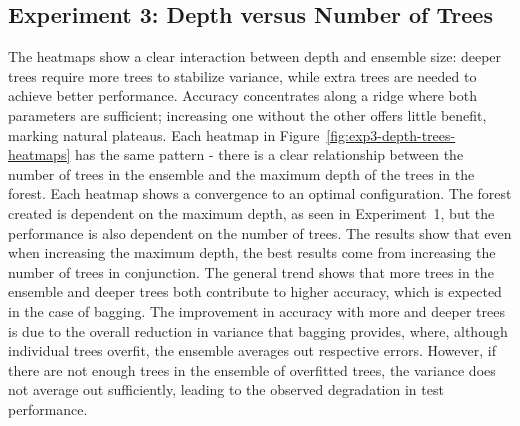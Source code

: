 \documentclass[conference]{IEEEtran}
\begin{document}
\subsection{Experiment 3: Depth versus Number of Trees}
The heatmaps show a clear interaction between depth and ensemble size: deeper trees require more trees to stabilize variance, while extra trees are needed to achieve better performance. Accuracy concentrates along a ridge where both parameters are sufficient; increasing one without the other offers little benefit, marking natural plateaus. Each heatmap in Figure~\ref{fig:exp3-depth-trees-heatmaps} has the same pattern - there is a clear relationship between the number of trees in the ensemble and the maximum depth of the trees in the forest. Each heatmap shows a convergence to an optimal configuration. The forest created is dependent on the maximum depth, as seen in Experiment~1, but the performance is also dependent on the number of trees. The results show that even when increasing the maximum depth, the best results come from increasing the number of trees in conjunction. The general trend shows that more trees in the ensemble and deeper trees both contribute to higher accuracy, which is expected in the case of bagging. The improvement in accuracy with more and deeper trees is due to the overall reduction in variance that bagging provides, where, although individual trees overfit, the ensemble averages out respective errors. However, if there are not enough trees in the ensemble of overfitted trees, the variance does not average out sufficiently, leading to the observed degradation in test performance.
\end{document}
